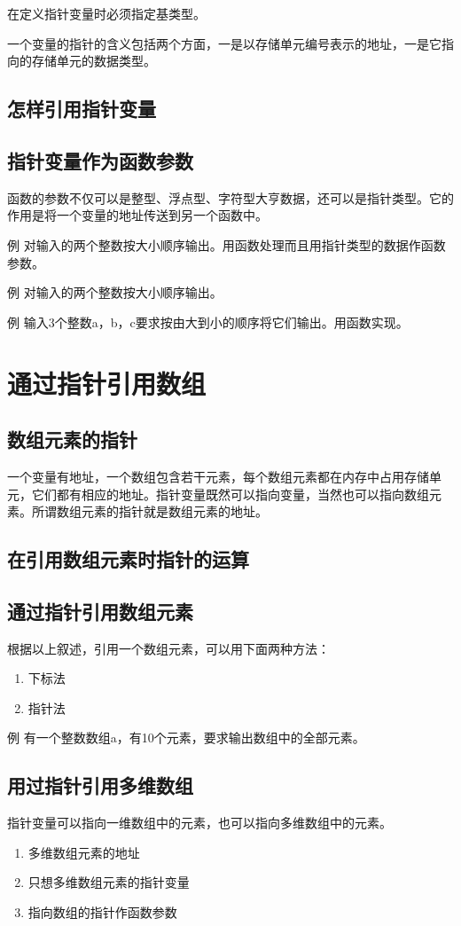 在定义指针变量时必须指定基类型。

一个变量的指针的含义包括两个方面，一是以存储单元编号表示的地址，一是它指向的存储单元的数据类型。
\subsection{怎样引用指针变量}
\subsection{指针变量作为函数参数}
函数的参数不仅可以是整型、浮点型、字符型大亨数据，还可以是指针类型。它的作用是将一个变量的地址传送到另一个函数中。

例 对输入的两个整数按大小顺序输出。用函数处理而且用指针类型的数据作函数参数。

例 对输入的两个整数按大小顺序输出。

例 输入3个整数a，b，c要求按由大到小的顺序将它们输出。用函数实现。
\section{通过指针引用数组}
\subsection{数组元素的指针}
一个变量有地址，一个数组包含若干元素，每个数组元素都在内存中占用存储单元，它们都有相应的地址。指针变量既然可以指向变量，当然也可以指向数组元素。所谓数组元素的指针就是数组元素的地址。
\subsection{在引用数组元素时指针的运算}
\subsection{通过指针引用数组元素}
根据以上叙述，引用一个数组元素，可以用下面两种方法：
\begin{enumerate}
	\item 下标法
	\item 指针法
\end{enumerate}
例 有一个整数数组a，有10个元素，要求输出数组中的全部元素。
\subsection{用过指针引用多维数组}
指针变量可以指向一维数组中的元素，也可以指向多维数组中的元素。
\begin{enumerate}
	\item 多维数组元素的地址
	\item 只想多维数组元素的指针变量
	\item 指向数组的指针作函数参数
\end{enumerate}
